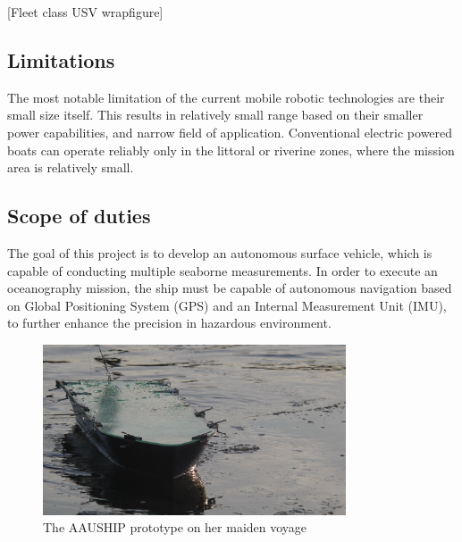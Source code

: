 [Fleet class USV wrapfigure]

\subsection*{Limitations}

The most notable limitation of the current mobile robotic technologies are their small size itself. This results in relatively small range based on their smaller power capabilities, and narrow field of application. Conventional electric powered boats can operate reliably only in the littoral or riverine zones, where the mission area is relatively small.

\subsection*{Scope of duties}

The goal of this project is to develop an autonomous surface vehicle, which is capable of conducting multiple seaborne measurements. In order to execute an oceanography mission, the ship must be capable of autonomous navigation based on Global Positioning System (GPS) and an Internal Measurement Unit (IMU), to further enhance the precision in hazardous environment.

\begin{figure}[H]
	\centering
	\includegraphics[width=0.8\textwidth]{img/aauship}
	\caption{The AAUSHIP prototype on her maiden voyage}
	\label{fig:aauship}
\end{figure}

